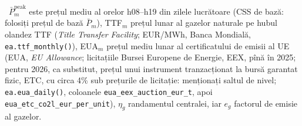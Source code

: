 {\where\ $\bar P^{\text{peak}}_m$ este prețul mediu al orelor h08--h19 din zilele lucrătoare (CSS de bază: folosiți prețul de bază $\bar P_m$), TTF$_m$ prețul lunar al gazelor naturale pe hubul olandez TTF (\emph{Title Transfer Facility}; EUR/MWh, Banca Mondială, \texttt{ea.ttf\_monthly()}),
EUA$_m$ prețul mediu lunar al certificatului de emisii al UE (EUA, \emph{EU Allowance}; licitațiile Bursei Europene de Energie, EEX, pînă în 2025; pentru 2026, ca substitut, prețul unui instrument tranzacționat la bursă garantat fizic, ETC, cu circa 4\% sub prețurile de licitație: menționați saltul de nivel; \texttt{ea.eua\_daily()}, coloanele \texttt{eua\_eex\_auction\_eur\_t}, apoi \texttt{eua\_etc\_co2l\_eur\_per\_unit}), $\eta_g$ randamentul centralei, iar $e_g$ factorul de emisie al gazelor.}

